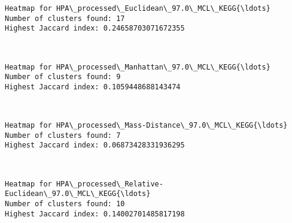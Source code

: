 \documentclass[11pt]{article}
\begin{document}
    \begin{Verbatim}[commandchars=\\\{\}]
Heatmap for HPA\_processed\_Euclidean\_97.0\_MCL\_KEGG{\ldots}
Number of clusters found: 17
Highest Jaccard index: 0.24658703071672355

    \end{Verbatim}

    \begin{center}
    \end{center}
    { \hspace*{\fill} \\}
    
    \begin{Verbatim}[commandchars=\\\{\}]
Heatmap for HPA\_processed\_Manhattan\_97.0\_MCL\_KEGG{\ldots}
Number of clusters found: 9
Highest Jaccard index: 0.1059448688143474

    \end{Verbatim}

    \begin{center}
    \end{center}
    { \hspace*{\fill} \\}
    
    \begin{Verbatim}[commandchars=\\\{\}]
Heatmap for HPA\_processed\_Mass-Distance\_97.0\_MCL\_KEGG{\ldots}
Number of clusters found: 7
Highest Jaccard index: 0.06873428331936295

    \end{Verbatim}

    \begin{center}
    \end{center}
    { \hspace*{\fill} \\}
    
    \begin{Verbatim}[commandchars=\\\{\}]
Heatmap for HPA\_processed\_Relative-Euclidean\_97.0\_MCL\_KEGG{\ldots}
Number of clusters found: 10
Highest Jaccard index: 0.14002701485817198

    \end{Verbatim}
\end{document}

